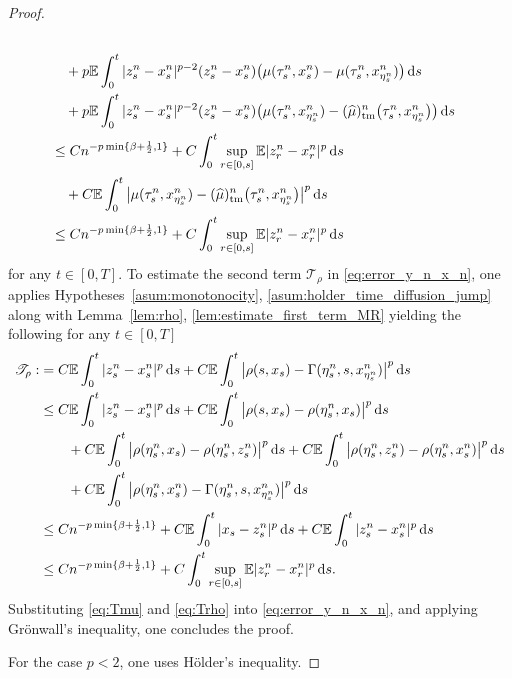 \documentclass[reqno,  oneside, 12pt]{amsart}
\newcommand{\E}{\mathbb E}
\begin{document}
\begin{proof}
\begin{align}
		\\
		&\quad+p\E\int_{0}^{t}|z_s^n-x_s^{n}|^{{p}-2}(z_s^n-x_s^{n})\big(\mu(\tau^n_s, x_{s}^n)-\mu(\tau^n_s, x_{\eta^n_s}^n)\big)\,\mathrm{d}s \notag
		\\
		&\quad+p\E\int_{0}^{t}|z_s^n-x_s^{n}|^{{p}-2}(z_s^n-x_s^{n})\big(\mu(\tau^n_s, x_{\eta^n_s}^n)-(\widehat\mu)_{\mathrm{tm}}^{n}\big(\tau^n_s,x_{\eta^n_s}^{n}\big)\big)\,\mathrm{d}s \notag
		\\
		&\leq Cn^{-p\min\{\beta+\frac{1}{2},1\}}  +C  \int_0^t\sup_{ r\in[0,s]}\E|z_r^n-x_r^{n}|^{p}\,\mathrm{d}s 
		\notag
		\\
		&\quad+C\E\int_{0}^{t}\big|\mu(\tau^n_s, x_{\eta^n_s}^n)-(\widehat\mu)_{\mathrm{tm}}^{n}\big(\tau^n_s,x_{\eta^n_s}^{n}\big)\big|^p\,\mathrm{d}s \notag
		\\
		&\leq Cn^{-p\min\{\beta+\frac{1}{2},1\}}  +C  \int_0^t\sup_{ r\in[0,s]}\E|z_r^n-x_r^{n}|^{p}\,\mathrm{d}s   
		\label{eq:Tmu}
	\end{align}
	for any $t\in[0,T]$.
	To estimate the second term $\mathscr{T}_\rho$ in \eqref{eq:error_y_n_x_n}, one applies  Hypotheses~\ref{asum:monotonocity}, \ref{asum:holder_time_diffusion_jump} along with  Lemma~\ref{lem:rho}, \ref{lem:estimate_first_term_MR} yielding the following for any $t \in [0, T]$
	\begin{align} \label{eq:Trho}
		\mathscr{T}_\rho: &= C\E\int_{0}^{t}|z_s^n-x_s^{n}|^{{p}}\,\mathrm{d}s 
		+C\E\int_{0}^{t}\big|\rho(s, x_s)-  \Gamma(\eta^n_s,s,x_{\eta^n_s}^{n})\big|^p\,\mathrm{d}s \notag
		\\
		&\leq
		C\E\int_{0}^{t}|z_s^n-x_s^{n}|^{{p}}\,\mathrm{d}s 
		+C\E\int_{0}^{t}\big|\rho(s, x_s)-\rho(\eta^n_s, x_s)\big|^p\,\mathrm{d}s	\notag
		\\
		&\qquad+C\E\int_{0}^{t}\big|\rho(\eta^n_s, x_s)-\rho(\eta^n_s, z_s^n)\big|^p\,\mathrm{d}s+C\E\int_{0}^{t}\big|\rho(\eta^n_s, z_s^n)-\rho(\eta^n_s, x_s^n)\big|^p\,\mathrm{d}s \notag
		\\
		&\qquad+
		C\E\int_{0}^{t}\big|\rho(\eta^n_s, x_s^n)-  \Gamma(\eta^n_s,s,x_{\eta^n_s}^{n})\big|^p\,\mathrm{d}s \notag
		\\
		&\leq Cn^{-p\min\{\beta+\frac{1}{2},1\}} +C\E\int_0^t|x_s-z_s^{n}|^{p}\,\mathrm{d}s +C\E\int_0^t|z_s^n-x_s^{n}|^{p}\,\mathrm{d}s  \notag
		\\
		&\leq Cn^{-p\min\{\beta+\frac{1}{2},1\}} +C \int_{0}^{t}\sup_{ r\in[0,s]}\E|z_r^n-x_r^{n}|^{p}\,\mathrm{d}s.
	\end{align}
	Substituting \eqref{eq:Tmu} and \eqref{eq:Trho} into \eqref{eq:error_y_n_x_n}, and applying {Gr\"onwall's} inequality, one concludes the proof.
	
	For the case \(  p< 2  \), one uses H\"older's inequality.
\end{proof}
\end{document}
